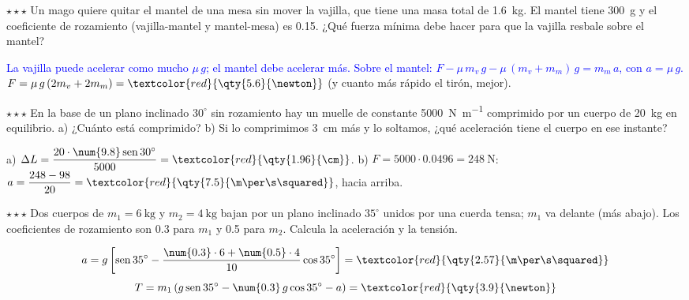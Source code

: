 \begin{exercise}
    \(\star\star\star\) Un mago quiere quitar el mantel de una mesa sin mover la vajilla, que tiene una masa total de \qty{1.6}{\kg}. El
    mantel tiene \qty{300}{\g} y el coeficiente de rozamiento (vajilla-mantel y mantel-mesa) es \num{0.15}. ¿Qué fuerza mínima debe hacer
    para que la vajilla resbale sobre el mantel?
    \begin{solu}
        \textcolor{blue}{La vajilla puede acelerar como mucho \(\mu\,g\); el mantel debe acelerar más. Sobre el mantel:
        \(F - \mu\,m_v\,g - \mu\,(m_v + m_m)\,g = m_m\,a\), con \(a = \mu\,g\).}
        \(F = \mu\,g\,(2m_v + 2m_m) = \textcolor{red}{\qty{5.6}{\newton}}\) (y cuanto más rápido el tirón, mejor).
    \end{solu}
\end{exercise}

\begin{exercise}
    \(\star\star\star\) En la base de un plano inclinado \(30^\circ\) sin rozamiento hay un muelle de constante \qty{5000}{\newton\per\m}
    comprimido por un cuerpo de \qty{20}{\kg} en equilibrio. a) ¿Cuánto está comprimido? b) Si lo comprimimos \qty{3}{\cm} más y lo
    soltamos, ¿qué aceleración tiene el cuerpo en ese instante?
    \begin{solu}
        a) \(\Delta L = \dfrac{20 \cdot \num{9.8}\sen 30^\circ}{5000} = \textcolor{red}{\qty{1.96}{\cm}}\).
        b) \(F = 5000 \cdot \num{0.0496} = \qty{248}{\newton}\): \(a = \dfrac{248 - 98}{20} = \textcolor{red}{\qty{7.5}{\m\per\s\squared}}\), hacia arriba.
    \end{solu}
\end{exercise}

\begin{exercise}
    \(\star\star\star\) Dos cuerpos de \(m_1 = \qty{6}{\kg}\) y \(m_2 = \qty{4}{\kg}\) bajan por un plano inclinado \(35^\circ\) unidos por
    una cuerda tensa; \(m_1\) va delante (más abajo). Los coeficientes de rozamiento son \num{0.3} para \(m_1\) y \num{0.5} para \(m_2\).
    Calcula la aceleración y la tensión.
    \begin{solu}
        \[ a = g\left[\sen 35^\circ - \frac{\num{0.3} \cdot 6 + \num{0.5} \cdot 4}{10}\cos 35^\circ\right] = \textcolor{red}{\qty{2.57}{\m\per\s\squared}} \]
        \[ T = m_1\,(g\sen 35^\circ - \num{0.3}\,g\cos 35^\circ - a) = \textcolor{red}{\qty{3.9}{\newton}} \]
    \end{solu}
\end{exercise}

